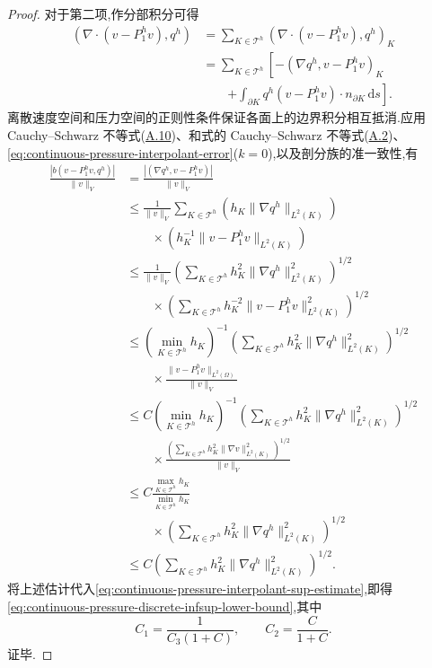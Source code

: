 \begin{proof}
对于第二项,作分部积分可得
\[
\begin{aligned}
  (\nabla\cdot(v-P_1^h v),q^h)
  &=\sum_{K\in\mathcal{T}^h}
       (\nabla\cdot(v-P_1^h v),q^h)_K\\
  &=\sum_{K\in\mathcal{T}^h}\left[
       -(\nabla q^h,v-P_1^h v)_K\right.\\
  &\qquad\left.+\int_{\partial K}
          q^h(v-P_1^h v)\cdot n_{\partial K}\,\mathrm{d}s
       \right].
\end{aligned}
\]
离散速度空间和压力空间的正则性条件保证各面上的边界积分相互抵消.应用 Cauchy--Schwarz 不等式(\hyperref[eq:appendix-a-10]{A.10})、和式的 Cauchy--Schwarz 不等式(\hyperref[eq:appendix-a-2]{A.2})、\cref{eq:continuous-pressure-interpolant-error}($k=0$),以及剖分族的准一致性,有
\[
  \begin{aligned}
    \frac{|b(v-P_1^h v,q^h)|}{\|v\|_V}
    &=\frac{|(\nabla q^h,v-P_1^h v)|}{\|v\|_V}\\
    &\le
      \frac{1}{\|v\|_V}
      \sum_{K\in\mathcal{T}^h}
         \left(h_K\|\nabla q^h\|_{L^2(K)}\right)\\
    &\qquad\times
         \left(h_K^{-1}\|v-P_1^h v\|_{L^2(K)}\right)\\
    &\le \frac{1}{\|v\|_V}
       \left(\sum_{K\in\mathcal{T}^h}
             h_K^2\|\nabla q^h\|_{L^2(K)}^2\right)^{1/2}\\
    &\qquad\times
       \left(\sum_{K\in\mathcal{T}^h}
             h_K^{-2}\|v-P_1^h v\|_{L^2(K)}^2\right)^{1/2}\\
    &\le
      \left(\min_{K\in\mathcal{T}^h}h_K\right)^{-1}
      \left(\sum_{K\in\mathcal{T}^h}
         h_K^2\|\nabla q^h\|_{L^2(K)}^2\right)^{1/2}\\
    &\qquad\times
      \frac{\|v-P_1^h v\|_{L^2(\Omega)}}{\|v\|_V}\\
    &\le C
      \left(\min_{K\in\mathcal{T}^h}h_K\right)^{-1}
      \left(\sum_{K\in\mathcal{T}^h}
         h_K^2\|\nabla q^h\|_{L^2(K)}^2\right)^{1/2}\\
    &\qquad\times
      \frac{\left(\sum_{K\in\mathcal{T}^h}
         h_K^2\|\nabla v\|_{L^2(K)}^2\right)^{1/2}}
           {\|v\|_V}\\
    &\le C
        \frac{\max_{K\in\mathcal{T}^h}h_K}
             {\min_{K\in\mathcal{T}^h}h_K}\\
    &\qquad\times
        \left(\sum_{K\in\mathcal{T}^h}
           h_K^2\|\nabla q^h\|_{L^2(K)}^2\right)^{1/2}\\
  &\le C
    \left(\sum_{K\in\mathcal{T}^h}
       h_K^2\|\nabla q^h\|_{L^2(K)}^2\right)^{1/2}.
\end{aligned}
\]
将上述估计代入\cref{eq:continuous-pressure-interpolant-sup-estimate},即得\cref{eq:continuous-pressure-discrete-infsup-lower-bound},其中
\[
  C_1=\frac{1}{C_3(1+C)},
  \qquad
  C_2=\frac{C}{1+C}.
\]
证毕.
\end{proof}

